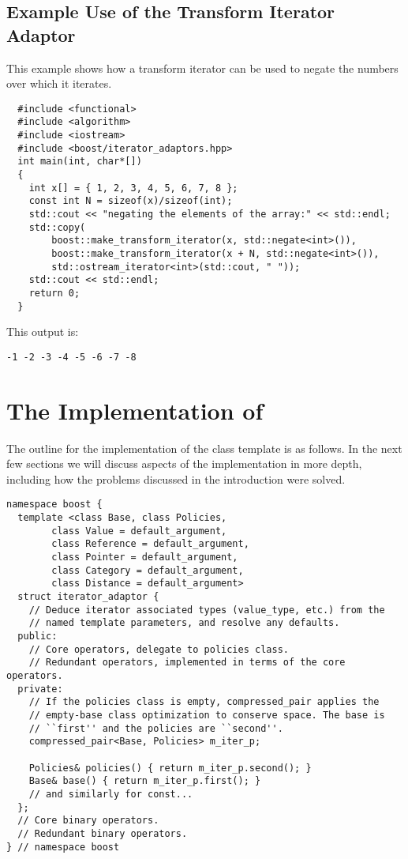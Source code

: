 \documentclass{netobjectdays}
\begin{document}
\subsection{Example Use of the Transform Iterator Adaptor}

This example shows how a transform iterator can be used to
negate the numbers over which it iterates.

{\footnotesize
\begin{verbatim}
  #include <functional>
  #include <algorithm>
  #include <iostream>
  #include <boost/iterator_adaptors.hpp>
  int main(int, char*[])
  {
    int x[] = { 1, 2, 3, 4, 5, 6, 7, 8 };
    const int N = sizeof(x)/sizeof(int);
    std::cout << "negating the elements of the array:" << std::endl;
    std::copy(
        boost::make_transform_iterator(x, std::negate<int>()),
        boost::make_transform_iterator(x + N, std::negate<int>()),
        std::ostream_iterator<int>(std::cout, " "));
    std::cout << std::endl;
    return 0;
  }
\end{verbatim}
}

\noindent This output is: 
{\footnotesize
\begin{verbatim}
-1 -2 -3 -4 -5 -6 -7 -8
\end{verbatim}
}


\section{The Implementation of }

The outline for the implementation of the 
class template is as follows. In the next few sections we will discuss
aspects of the implementation in more depth, including how the
problems discussed in the introduction were solved.

{\footnotesize
\begin{verbatim}
namespace boost {
  template <class Base, class Policies, 
	    class Value = default_argument,
	    class Reference = default_argument,
	    class Pointer = default_argument,
	    class Category = default_argument,
	    class Distance = default_argument>
  struct iterator_adaptor {
    // Deduce iterator associated types (value_type, etc.) from the
    // named template parameters, and resolve any defaults.
  public:
    // Core operators, delegate to policies class.
    // Redundant operators, implemented in terms of the core operators.
  private:
    // If the policies class is empty, compressed_pair applies the
    // empty-base class optimization to conserve space. The base is
    // ``first'' and the policies are ``second''.
    compressed_pair<Base, Policies> m_iter_p;

    Policies& policies() { return m_iter_p.second(); }
    Base& base() { return m_iter_p.first(); }
    // and similarly for const...
  };
  // Core binary operators.
  // Redundant binary operators.
} // namespace boost
\end{verbatim}
}
\end{document}
